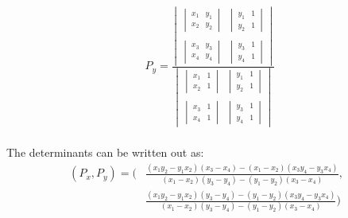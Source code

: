 \[\begin{array}{ll}
&

P_y = \frac{\begin{vmatrix} 
                \begin{vmatrix} x_1 & y_1\\
                                x_2 & y_2
                \end{vmatrix} &  
                \begin{vmatrix} y_1 & 1
                              \\y_2 & 1
                \end{vmatrix} \\\\ 
                \begin{vmatrix} x_3 & y_3\\
                                x_4 & y_4
                \end{vmatrix} & 
                \begin{vmatrix} y_3 & 1\\
                                y_4 & 1
                \end{vmatrix} 
            \end{vmatrix} }
           {\begin{vmatrix} 
               \begin{vmatrix} x_1 & 1\\
                               x_2 & 1
               \end{vmatrix} &
               \begin{vmatrix} y_1 & 1\\
                               y_2 & 1
            \end{vmatrix} \\\\ 
            \begin{vmatrix} x_3 & 1\\
                            x_4 & 1
            \end{vmatrix} & 
            \begin{vmatrix} y_3 & 1\\
                            y_4 & 1
            \end{vmatrix} 
     \end{vmatrix}}\,\!
\\

\end{array}
\]

The determinants can be written out as:
\begin{align*}
    (P_x, P_y)= \bigg(&\frac{(x_1 y_2-y_1 x_2)(x_3-x_4)-(x_1-x_2)(x_3 y_4-y_3 x_4)}{(x_1-x_2)(y_3-y_4)-(y_1-y_2)(x_3-x_4)}, \\
                      &\frac{(x_1 y_2-y_1 x_2)(y_3-y_4)-(y_1-y_2)(x_3 y_4-y_3 x_4)}{(x_1-x_2)(y_3-y_4)-(y_1-y_2)(x_3-x_4)}\bigg)
\end{align*}

